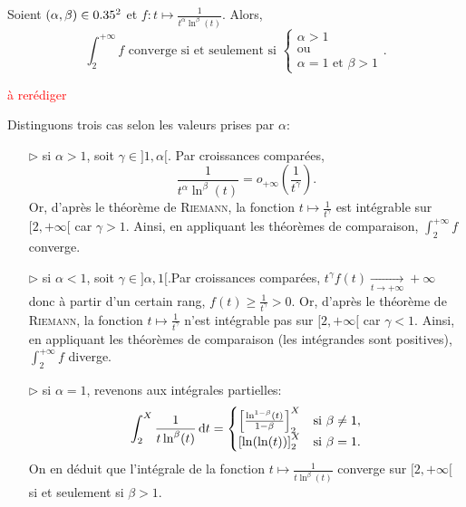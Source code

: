 \begin{prop}{}
    Soient $(\alpha, \beta) \in  0.35^2$ et $f:t \mapsto \frac{1}{t^{\alpha} \ln^{\beta} (t)}$. Alors,
    $$\int_{2}^{+ \infty} f \text{ converge si et seulement si }
    \begin{cases}
    \alpha > 1 \\
    \text{ou}\\
    \alpha = 1 \text{ et } \beta > 1
    \end{cases}.
    $$
\end{prop}

\textcolor{red}{à rerédiger}
\begin{preuve}
    Distinguons trois cas selon les valeurs prises par $\alpha$:
    \begin{enumerate}
        \item[$\rhd$] si $\alpha > 1$, soit $\gamma \in ]1, \alpha[$. Par croissances comparées,
        $$\displaystyle \frac{1}{t^{\alpha} \ln^{\beta} (t)} = o_{+ \infty} \left( \frac{1}{t^{\gamma}} \right).$$
        Or, d'après le théorème de \textsc{Riemann}, la fonction $t \mapsto \frac{1}{t^\gamma}$ est intégrable sur $[2, +\infty[$ car $\gamma > 1$. Ainsi, en appliquant les théorèmes de comparaison, $\int_2^{+ \infty} f$ converge.
        \item[$\rhd$] si $\alpha < 1$, soit $\gamma \in ]\alpha, 1[$.Par croissances comparées,
        $t^{\gamma} f(t) \xrightarrow[t \to + \infty]{} + \infty$
        donc à partir d'un certain rang, $f(t) \geqslant \frac{1}{t^{\gamma}} > 0$. Or, d'après le théorème de \textsc{Riemann}, la fonction $t \mapsto \frac{1}{t^\gamma}$ n'est intégrable pas sur $[2, +\infty[$ car $\gamma < 1$. Ainsi, en appliquant les théorèmes de comparaison (les intégrandes sont positives), $\int_2^{+ \infty} f$ diverge.
        \item[$\rhd$] si $\alpha = 1$, revenons aux intégrales partielles:
        $$\int_{2}^{X} \frac{1}{t \ln^{\beta} (t)} \, \mathrm{d} t = 
        \begin{cases}
            \left[ \frac{\ln ^{1-\beta} (t)}{1-\beta} \right]_2 ^X & \text{si } \beta \not = 1, \\
            \left[\ln (\ln(t)) \right]_2 ^X & \text{si } \beta = 1.
        \end{cases}
        $$
        On en déduit que l'intégrale de la fonction $t \mapsto \frac{1}{t \ln^{\beta} (t)}$ converge sur $[2, + \infty[$ si et seulement si $\beta > 1$.
    \end{enumerate}
\end{preuve}
